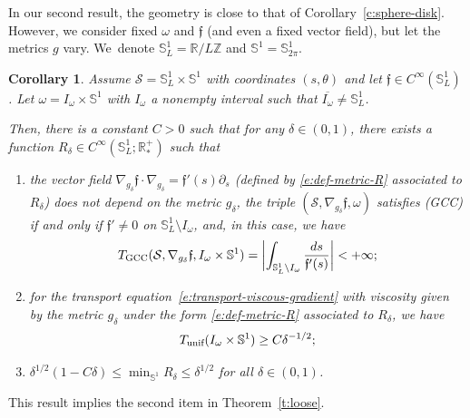 \documentclass[JEP,XML,SOM,Unicode]{cedram}
\newcommand{\GCC}{\textup{GCC}}
\newcommand{\pGCC}{\textup{(GCC)}\xspace}
\newcommand{\unif}{\textup{unif}}
\newtheorem{corollary}[lemma]{Corollary}
\theoremstyle{definition}
\newcommand{\calS}{\ensuremath{\mathcal S}}
\newcommand{\mb}[1]{\ensuremath{\mathbb{#1}}}
\newcommand{\R}{{\mb{R}}}
\newcommand{\bS}{\ensuremath{\mathbb S}}
\newcommand{\Z}{\mathbb Z}
\newcommand{\f}{\ensuremath{\mathfrak{f}}}
\let\d\partial
\let\ovl\overline
\begin{document}
In our second result, the geometry is close to that of Corollary~\ref{c:sphere-disk}. However, we consider fixed $\omega$ and $\f$ (and even a fixed vector field), but let the metrics $g$ vary.
We~denote $\bS^1_L = \R/L\Z$ and $\bS^1 =\bS^1_{2\pi}$.
\begin{corollary}
\label{c:example-torus}
Assume $\calS=\bS^1_L \times \bS^1$ with coordinates $(s,\theta)$ and let $\f\in C^{\infty}(\bS^1_L)$.
Let $\omega = I_\omega \times \bS^1$ with $I_\omega$ a nonempty interval such that $\ovl{I_\omega} \neq \bS^1_L$.

Then, there is a constant $C>0$ such that for any $\delta \in (0,1)$, there exists a function $R_\delta \in C^\infty(\bS^1_L ;\R^+_*)$ such that
\begin{enumerate}
\item the vector field $\nabla_{g_\delta}\f \cdot \nabla_{g_\delta}= \f'(s) \d_s$ (defined by \eqref{e:def-metric-R} associated to $R_\delta$) does not depend on the metric $g_\delta$, the triple $(\calS,\nabla_{g_\delta}\f,\omega)$ satisfies \pGCC if and only if $\f'\neq 0$ on $\bS^1_L \setminus I_\omega$, and, in this case, we have\vspace*{-3pt}
\[
T_{\GCC}(\calS, \nabla_{g_\delta}\f,I_\omega \times \bS^1) = \biggl| \int_{\bS^1_L \setminus I_\omega} \frac{ds}{\f'(s)} \biggr| < +\infty;
\]
\item for the transport equation~\eqref{e:transport-viscous-gradient} with viscosity given by the metric $g_\delta$ under the form \eqref{e:def-metric-R} associated to $R_\delta$, we have\vspace*{-3pt}
\[
T_{\unif}(I_\omega \times\bS^1) \geq C\delta^{-1/2};
\]
\item $\delta^{1/2} (1-C\delta) \leq \min_{\bS^1}R_\delta \leq \delta^{1/2}$ for all $\delta \in (0,1)$.
\end{enumerate}
\end{corollary}
This result implies the second item in Theorem~\ref{t:loose}.
\end{document}
